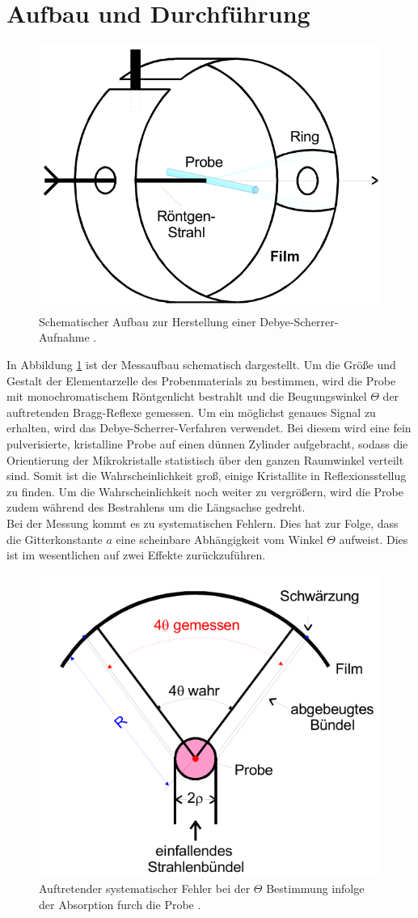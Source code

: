 \section{Aufbau und Durchführung} %
\label{sub:debye_scherrer_verfahren}

\begin{figure}[h!]
    \centering
    \includegraphics[width=0.5\linewidth]{images/aufbau.png}
    \caption{Schematischer Aufbau zur Herstellung einer Debye-Scherrer-Aufnahme \cite{V41}.}
    \label{fig:aufbau}
\end{figure}
In Abbildung \ref{fig:aufbau} ist der Messaufbau schematisch dargestellt.
Um die Größe und Gestalt der Elementarzelle des Probenmaterials zu bestimmen, wird die Probe mit monochromatischem Röntgenlicht bestrahlt und die Beugungswinkel $\Theta$ der auftretenden Bragg-Reflexe gemessen.
Um ein möglichst genaues Signal zu erhalten, wird das Debye-Scherrer-Verfahren verwendet.
Bei diesem wird eine fein pulverisierte, kristalline Probe auf einen dünnen Zylinder aufgebracht, sodass die Orientierung der Mikrokristalle statistisch über den ganzen Raumwinkel verteilt sind.
Somit ist die Wahrscheinlichkeit groß, einige Kristallite in Reflexionsstellug zu finden.
Um die Wahrscheinlichkeit noch weiter zu vergrößern, wird die Probe zudem während des Bestrahlens um die Längsachse gedreht.
\\
Bei der Messung kommt es zu systematischen Fehlern.
Dies hat zur Folge, dass die Gitterkonstante $a$ eine scheinbare Abhängigkeit vom Winkel $\Theta$ aufweist.
Dies ist im wesentlichen auf zwei Effekte zurückzuführen.
\begin{figure}[h!]
    \centering
    \includegraphics[width=0.5\linewidth]{images/fehler1.png}
    \caption{Auftretender systematischer Fehler bei der $\Theta$ Bestimmung infolge der Absorption furch die Probe \cite{V41}.}
    \label{fig:fehler1}
\end{figure}
